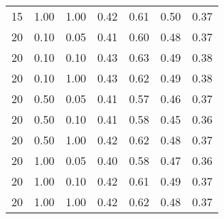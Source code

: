 \begin{tabular}{lllcccc}
15 & 1.00 & 1.00 & 0.42 & 0.61 & 0.50 & 0.37 \\ 
20 & 0.10 & 0.05 & 0.41 & 0.60 & 0.48 & 0.37 \\ 
20 & 0.10 & 0.10 & 0.43 & 0.63 & 0.49 & 0.38 \\ 
20 & 0.10 & 1.00 & 0.43 & 0.62 & 0.49 & 0.38 \\ 
20 & 0.50 & 0.05 & 0.41 & 0.57 & 0.46 & 0.37 \\ 
20 & 0.50 & 0.10 & 0.41 & 0.58 & 0.45 & 0.36 \\ 
20 & 0.50 & 1.00 & 0.42 & 0.62 & 0.48 & 0.37 \\ 
20 & 1.00 & 0.05 & 0.40 & 0.58 & 0.47 & 0.36 \\ 
20 & 1.00 & 0.10 & 0.42 & 0.61 & 0.49 & 0.37 \\ 
20 & 1.00 & 1.00 & 0.42 & 0.62 & 0.48 & 0.37 \\ 
\end{tabular} 
